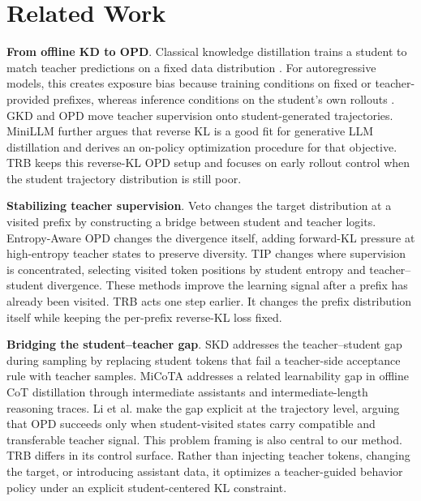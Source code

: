 \documentclass{llmxive}
\providecommand{\paragraph}[1]{\vspace{1mm}\noindent\textbf{#1}.}
\begin{document}
\section{Related Work}
\label{sec:related}

\paragraph{From offline KD to OPD}
Classical knowledge distillation trains a student to match teacher predictions on a fixed data distribution \citep{hinton2015distilling}.
For autoregressive models, this creates exposure bias because training conditions on fixed or teacher-provided prefixes, whereas inference conditions on the student's own rollouts \citep{bengio2015scheduled}.
GKD and OPD \citep{opd} move teacher supervision onto student-generated trajectories.
MiniLLM \citep{gu2023minillm} further argues that reverse KL is a good fit for generative LLM distillation and derives an on-policy optimization procedure for that objective.
TRB keeps this reverse-KL OPD setup and focuses on early rollout control when the student trajectory distribution is still poor.

\paragraph{Stabilizing teacher supervision}
Veto \citep{veto} changes the target distribution at a visited prefix by constructing a bridge between student and teacher logits.
Entropy-Aware OPD \citep{jin2026entropyaware} changes the divergence itself, adding forward-KL pressure at high-entropy teacher states to preserve diversity.
TIP \citep{tip} changes where supervision is concentrated, selecting visited token positions by student entropy and teacher--student divergence.
These methods improve the learning signal after a prefix has already been visited.
TRB acts one step earlier. It changes the prefix distribution itself while keeping the per-prefix reverse-KL loss fixed.

\paragraph{Bridging the student--teacher gap}
SKD \citep{skd} addresses the teacher--student gap during sampling by replacing student tokens that fail a teacher-side acceptance rule with teacher samples.
MiCoTA \citep{ding2025micota} addresses a related learnability gap in offline CoT distillation through intermediate assistants and intermediate-length reasoning traces.
Li et al. \citep{li2026rethinking} make the gap explicit at the trajectory level, arguing that OPD succeeds only when student-visited states carry compatible and transferable teacher signal.
This problem framing is also central to our method.
TRB differs in its control surface. Rather than injecting teacher tokens, changing the target, or introducing assistant data, it optimizes a teacher-guided behavior policy under an explicit student-centered KL constraint.
\end{document}
